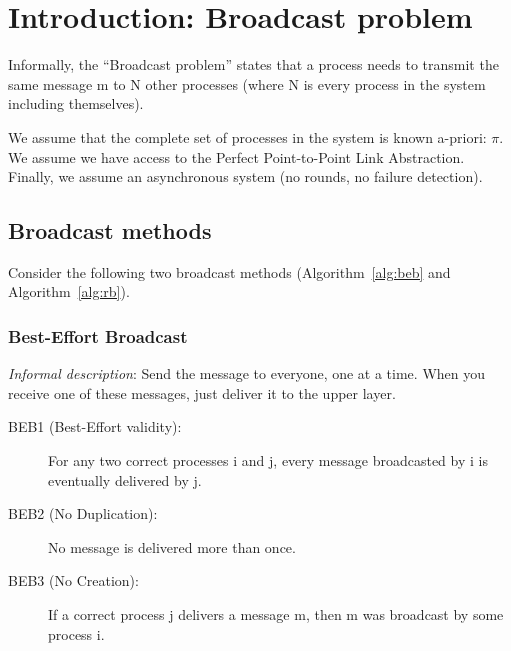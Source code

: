 \documentclass[10pt,a4paper]{article}
\title{\titulo}
\date{\data}
\author{\name\\ \institution\\ {\small (Based on notes produced by João Leitão)}}
\begin{document}

\maketitle

\section{Introduction: Broadcast problem}
Informally, the ``Broadcast problem'' states that a process needs to transmit the same message m to N other processes (where N is every process in the system including themselves).

We assume that the complete set of processes in the system is known a-priori: \(\pi\). We assume we have access to the Perfect Point-to-Point Link Abstraction. Finally, we assume an asynchronous system (no rounds, no failure detection).

\subsection*{Broadcast methods}
Consider the following two broadcast methods (Algorithm~\ref{alg:beb} and Algorithm~\ref{alg:rb}).

\subsubsection*{Best-Effort Broadcast}
\textit{Informal description}: Send the message to everyone, one at a time. When you receive one of these messages, just deliver it to the upper layer.

\begin{description}
  \item[BEB1 (Best-Effort validity):] For any two correct processes i and j, every message broadcasted by i is eventually delivered by j.
  \item[BEB2 (No Duplication):] No message is delivered more than once.
  \item[BEB3 (No Creation):] If a correct process j delivers a message m, then m was broadcast by some process i.  
\end{description}
\end{document}
